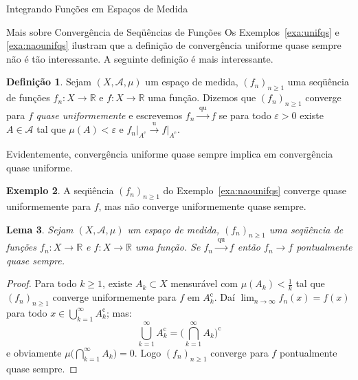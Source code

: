 \documentclass[oneside,final,11pt]{amsbook}
\newcommand{\R}{\mathds R}
\newcommand{\compl}{\mathrm c}
\newcommand{\To}[1]{\xrightarrow{\;\mathrm{#1}\;}}
\theoremstyle{remark}\newtheorem{exercise}{Exercício}[chapter]
\theoremstyle{remark}\newtheorem{*exercise}[exercise]{\hbox to 0pt{\hskip 0pt minus 1fil*}Exercício}
\theoremstyle{definition}\newtheorem{exdefin}{Definição}[chapter]
\theoremstyle{plain}\newtheorem{teo}{Teorema}[section]
\theoremstyle{plain}\newtheorem{lem}[teo]{Lema}
\theoremstyle{plain}\newtheorem{prop}[teo]{Proposição}
\theoremstyle{plain}\newtheorem{cor}[teo]{Corolário}
\theoremstyle{definition}\newtheorem{defin}[teo]{Definição}
\theoremstyle{remark}\newtheorem{rem}[teo]{Observação}
\theoremstyle{definition}\newtheorem{notation}[teo]{Notação}
\theoremstyle{definition}\newtheorem{convention}[teo]{Convenção}
\theoremstyle{definition}\newtheorem{example}[teo]{Exemplo}
\numberwithin{section}{chapter}
\numberwithin{equation}{section}
\begin{document}
\begin{chapter}{Integrando Funções em Espaços de Medida}
\begin{section}{Mais sobre Convergência de Seqüências de Funções}
Os Exemplos~\ref{exa:unifqs} e \ref{exa:naounifqs} ilustram que a definição de convergência uniforme quase sempre não
é tão interessante. A seguinte definição é mais interessante.
\begin{defin}
Sejam $(X,\mathcal A,\mu)$ um espaço de medida, $(f_n)_{n\ge1}$ uma seqüência de funções $f_n:X\to\R$
e $f:X\to\R$ uma função. Dizemos que $(f_n)_{n\ge1}$ converge para $f$
{\em quase uniformemente\/}%
 e escrevemos
$f_n\To{qu}f$\index[simbolos]{$f_n\To{qu}f$} se para todo $\varepsilon>0$ existe $A\in\mathcal A$ tal que $\mu(A)<\varepsilon$
e $f_n\vert_{A^\compl}\To uf\vert_{A^\compl}$.
\end{defin}
Evidentemente, convergência uniforme quase sempre implica em convergência quase uniforme.

\begin{example}
A seqüência $(f_n)_{n\ge1}$ do Exemplo~\ref{exa:naounifqs} converge quase uniformemente para $f$, mas não converge
uniformemente quase sempre.
\end{example}

\begin{lem}\label{thm:Egorofacil}
Sejam $(X,\mathcal A,\mu)$ um espaço de medida, $(f_n)_{n\ge1}$ uma se\-qüên\-cia de funções $f_n:X\to\R$
e $f:X\to\R$ uma função. Se $f_n\To{qu}f$ então $f_n\to f$ pontualmente quase sempre.
\end{lem}
\begin{proof}
Para todo $k\ge1$, existe $A_k\subset X$ mensurável com $\mu(A_k)<\frac1k$ tal que
$(f_n)_{n\ge1}$ converge uniformemente para $f$ em $A_k^\compl$. Daí $\lim_{n\to\infty}f_n(x)=f(x)$ para
todo $x\in\bigcup_{k=1}^\infty A_k^\compl$; mas:
\[\bigcup_{k=1}^\infty A_k^\compl=\Big(\bigcap_{k=1}^\infty A_k\Big)^\compl\]
e obviamente $\mu\big(\bigcap_{k=1}^\infty A_k\big)=0$. Logo $(f_n)_{n\ge1}$ converge para $f$ pontualmente quase sempre.
\end{proof}


\end{section}
\end{chapter}
\end{document}
